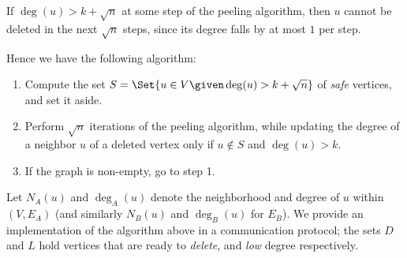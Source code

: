 \begin{observation}\label{obs:sqrt-local}
  If $\deg(u) > k + \sqrt{n}$ at some step of the peeling algorithm,
  then $u$ cannot be deleted in the next $\sqrt{n}$ steps, since its degree
  falls by at most $1$ per step.
\end{observation}

Hence we have the following algorithm:
\begin{enumerate}
  \item Compute the set $S = \Set{u \in V \given \deg(u) > k + \sqrt{n}}$ of
    \emph{safe} vertices, and set it aside.
  \item Perform $\sqrt{n}$ iterations of the peeling algorithm, while updating
    the degree of a neighbor $u$ of a deleted vertex only if $u \notin S$ and $\deg(u) > k$.
  \item If the graph is non-empty, go to step 1.
\end{enumerate}

Let $N_A(u)$ and $\deg_A(u)$ denote the neighborhood and degree of $u$ within
$(V, E_A)$ (and similarly $N_B(u)$ and $\deg_B(u)$ for $E_B$).
We provide an implementation of the algorithm above in a communication protocol;
the sets $D$ and $L$ hold vertices that are ready to \emph{delete}, and
\emph{low} degree respectively.

